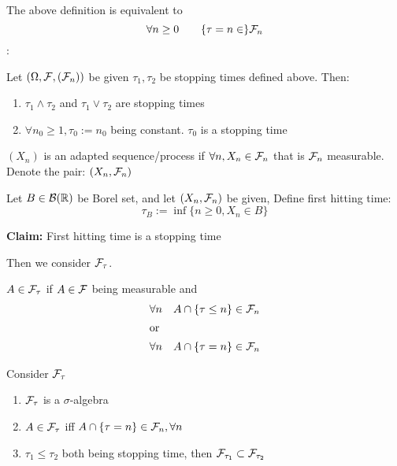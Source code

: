 \begin{rem}
The above definition is equivalent to 
\begin{equation*}
    \forall n\geq 0 \qquad \{\tau = n \in \}\mathcal{F}_n
\end{equation*}
\pf:
\vspace{4cm}
\end{rem}
\begin{lem}
Let $(\Omega, \mathcal{F}, (\mathcal{F}_n))$ be given $\tau_1, \tau_2$ be stopping times defined above. Then:
\begin{enumerate}
    \item $\tau_1\wedge \tau_2$ and $\tau_1\vee \tau_2$ are stopping times
    \item $\forall n_0 \geq 1, \tau_0 := n_0$ being constant. $\tau_0$ is a stopping time
\end{enumerate}
\end{lem}
\pf 
\vspace{8cm}
\begin{dfn} $(X_n)$ is an adapted sequence/process if $\forall n, X_n \in \mathcal{F}_n$ that is $\mathcal{F}_n$ measurable. Denote the pair: $(X_n, \mathcal{F}_n)$

\end{dfn}
\newpage
\begin{dfn}
Let $B\in \mathcal{B}(\mathbb{R})$ be Borel set, and let $(X_n, \mathcal{F}_n)$ be given, Define first hitting time: 
\begin{equation*}
    \tau_B := \inf \{n\geq 0, X_n\in B\}
\end{equation*}
\end{dfn}
\textbf{Claim:} First hitting time is a stopping time \\
\pf \vspace{4cm}

Then we consider $\mathcal{F}_\tau$.
\begin{dfn}
$A\in \mathcal{F}_\tau$ if $A\in \mathcal{F}$ being measurable and 
\begin{align*}
    \forall n\quad A\cap \{\tau \leq n\} \in \mathcal{F}_n \\
    \intertext{or}
    \forall n \quad A\cap \{\tau = n\} \in \mathcal{F}_n
\end{align*}
\end{dfn}
\begin{thm}
Consider $\mathcal{F}_\tau$
\begin{enumerate}
    \item $\mathcal{F}_\tau$ is a $\sigma$-algebra
    \item $A\in \mathcal{F}_\tau$ iff $A\cap \{\tau = n\}\in \mathcal{F}_n, \forall n$
    \item $\tau_1 \leq \tau_2$ both being stopping time, then $\mathcal{F}_{\tau_1}\subset \mathcal{F}_{\tau_2}$
\end{enumerate}
\end{thm}
\pf


